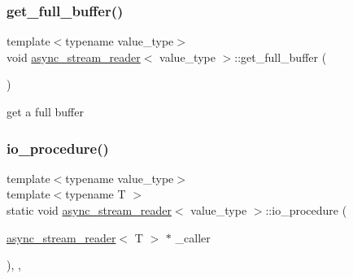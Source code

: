 \mbox{\label{classasync__stream__reader_a15c2bd3c259b3a84de866c02dd6c7405}} 
\subsubsection{\texorpdfstring{get\+\_\+full\+\_\+buffer()}{get\_full\_buffer()}}
{\footnotesize\ttfamily template$<$typename value\+\_\+type$>$ \\
void \hyperlink{classasync__stream__reader}{async\+\_\+stream\+\_\+reader}$<$ value\+\_\+type $>$\+::get\+\_\+full\+\_\+buffer (\begin{DoxyParamCaption}{ }\end{DoxyParamCaption})\hspace{0.3cm}{\ttfamily [inline]}}



get a full buffer 

\mbox{\label{classasync__stream__reader_aee14e37431d75f5a80831ce6c3632ea2}} 
\subsubsection{\texorpdfstring{io\+\_\+procedure()}{io\_procedure()}}
{\footnotesize\ttfamily template$<$typename value\+\_\+type$>$ \\
template$<$typename T $>$ \\
static void \hyperlink{classasync__stream__reader}{async\+\_\+stream\+\_\+reader}$<$ value\+\_\+type $>$\+::io\+\_\+procedure (\begin{DoxyParamCaption}\item[{\hyperlink{classasync__stream__reader}{async\+\_\+stream\+\_\+reader}$<$ T $>$ $\ast$}]{\+\_\+caller }\end{DoxyParamCaption})\hspace{0.3cm}{\ttfamily [inline]}, {\ttfamily [static]}, {\ttfamily [private]}}



